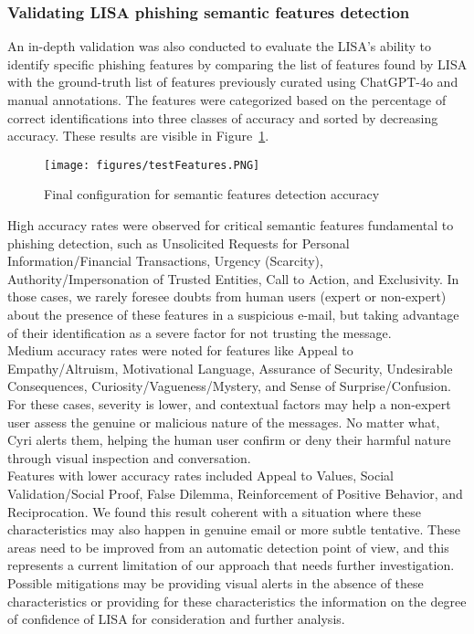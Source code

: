 \subsubsection{Validating LISA phishing semantic features detection}
\label{sec:valsemfeat}

An in-depth validation was also conducted to evaluate the LISA's ability to identify specific phishing features by comparing the list of features found by LISA with the ground-truth list of features previously curated using ChatGPT-4o and manual annotations. The features were categorized based on the percentage of correct identifications into three classes of accuracy and sorted by decreasing accuracy. These results are visible in Figure~\ref{fig:testFeatures}.

\begin{figure}[htbp]
  \centering
  \texttt{[image: figures/testFeatures.PNG]}
  \caption{Final configuration for semantic features detection accuracy}
  \label{fig:testFeatures}
\end{figure}

High accuracy rates were observed for critical semantic features fundamental to phishing detection, such as Unsolicited Requests for Personal Information/Financial Transactions, Urgency (Scarcity), Authority/Impersonation of Trusted Entities, Call to Action, and Exclusivity.
In those cases, we rarely foresee doubts from human users (expert or non-expert) about the presence of these features in a suspicious e-mail, but taking advantage of their identification as a severe factor for not trusting the message.
\\
Medium accuracy rates were noted for features like Appeal to Empathy/Altruism, Motivational Language, Assurance of Security, Undesirable Consequences, Curiosity/Vagueness/Mystery, and Sense of Surprise/Confusion.
For these cases, severity is lower, and contextual factors may help a non-expert user assess the genuine or malicious nature of the messages. No matter what, Cyri alerts them, helping the human user confirm or deny their harmful nature through visual inspection and conversation.
\\
Features with lower accuracy rates included Appeal to Values, Social Validation/Social Proof, False Dilemma, Reinforcement of Positive Behavior, and Reciprocation.
We found this result coherent with a situation where these characteristics may also happen in genuine email or more subtle tentative. These areas need to be improved from an automatic detection point of view, and this represents a current limitation of our approach that needs further investigation. Possible mitigations may be providing visual alerts in the absence of these characteristics or providing for these characteristics the information on the degree of confidence of LISA for consideration and further analysis. 

